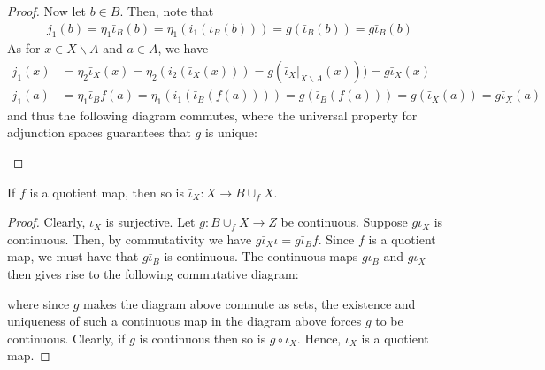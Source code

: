 \documentclass[12pt,reqno]{amsart}
\numberwithin{theorem}{section}
\theoremstyle{definition}
\theoremstyle{remark}
\numberwithin{equation}{section}
\theoremstyle{definition}
\begin{document}
\begin{proof}
    Now let $b \in B$. Then, note that
    \begin{align*}
        j_1(b) = \eta_1 \bar \iota_B(b) = \eta_1 (i_1(\iota_B(b))) = g(\bar\iota_B(b)) = g\bar\iota_B (b)
    \end{align*}
    As for $x \in X\backslash A$ and $a \in A$, we have
    \begin{align*}
        j_1 (x) &= \eta_2 \bar \iota_X(x) = \eta_2 (i_2(\bar\iota_X(x))) = g(\bar\iota_X|_{X\backslash A}(x))) = g\bar \iota_X (x) \\
        j_1 (a) &= \eta_1\bar \iota_B f(a) = \eta_1 (i_1(\bar\iota_B(f(a)))) = g(\bar \iota_B(f(a))) =  g(\bar \iota_X(a))= g\bar \iota_X (a)
    \end{align*}
    and thus the following diagram commutes, where the universal property for adjunction spaces guarantees that $g$ is unique:
    \begin{center}
    \end{center}
\end{proof}
\begin{proposition}
    If $f$ is a quotient map, then so is $\bar \iota_X:X \rightarrow B\cup_fX$.
\end{proposition}
\begin{proof}
    Clearly, $\bar \iota_X$ is surjective. Let $g:B\cup_fX \rightarrow Z$ be continuous. Suppose $g\bar \iota_X$ is continuous. Then, by commutativity we have $g\bar \iota_X \iota= g\bar \iota_B f$. Since $f$ is a quotient map, we must have that $g\bar \iota_B$ is continuous. The continuous maps $g\iota_B$ and $g\iota_X$ then gives rise to the following commutative diagram:
    \begin{center}
    \end{center}
    where since $g$ makes the diagram above commute as sets, the existence and uniqueness of such a continuous map in the diagram above forces $g$ to be continuous. Clearly, if $g$ is continuous then so is $g\circ \iota_X$. Hence, $\iota_X$ is a quotient map.
\end{proof}
\end{document}
